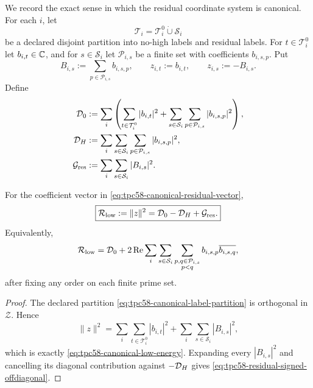 We record the exact sense in which the residual coordinate system is
canonical.  For each \(i\), let
\begin{equation}
 \mathcal T_i=\mathcal T_i^0\mathbin{\dot\cup}\mathcal S_i
 \label{eq:tpc58-canonical-label-partition}
\end{equation}
be a declared disjoint partition into no-high labels and residual labels.
For \(t\in\mathcal T_i^0\) let \(b_{i,t}\in\mathbb C\), and for
\(s\in\mathcal S_i\) let \(\mathcal P_{i,s}\) be a finite set with
coefficients \(b_{i,s,p}\).  Put
\begin{equation}
 B_{i,s}:=\sum_{p\in\mathcal P_{i,s}}b_{i,s,p},
 \qquad
 z_{i,t}:=b_{i,t},
 \qquad
 z_{i,s}:=-B_{i,s}.
 \label{eq:tpc58-canonical-residual-vector}
\end{equation}
Define
\begin{align}
 \mathcal D_0
 &:=\sum_i\left(
      \sum_{t\in\mathcal T_i^0}|b_{i,t}|^2
      +\sum_{s\in\mathcal S_i}\sum_{p\in\mathcal P_{i,s}}
       |b_{i,s,p}|^2\right),
 \label{eq:tpc58-ambient-diagonal}\\
 \mathcal D_H
 &:=\sum_i\sum_{s\in\mathcal S_i}
      \sum_{p\in\mathcal P_{i,s}}|b_{i,s,p}|^2,
 \label{eq:tpc58-high-diagonal}\\
 \mathcal G_{\rm res}
 &:=\sum_i\sum_{s\in\mathcal S_i}|B_{i,s}|^2.
 \label{eq:tpc58-abstract-residual-grouped-energy}
\end{align}

\begin{proposition}
\label{prop:tpc58-canonical-residual-identity}
For the coefficient vector in
\eqref{eq:tpc58-canonical-residual-vector},
\begin{equation}
 \boxed{
 \mathcal R_{\rm low}:=\|z\|^2
 =\mathcal D_0-\mathcal D_H+\mathcal G_{\rm res}.}
 \label{eq:tpc58-canonical-low-energy}
\end{equation}
Equivalently,
\begin{equation}
 \mathcal R_{\rm low}
 =\mathcal D_0+2\operatorname{Re}
   \sum_i\sum_{s\in\mathcal S_i}
   \sum_{\substack{p,q\in\mathcal P_{i,s}\\p<q}}
   b_{i,s,p}\overline{b_{i,s,q}},
 \label{eq:tpc58-residual-signed-offdiagonal}
\end{equation}
after fixing any order on each finite prime set.
\end{proposition}

\begin{proof}
The declared partition
\eqref{eq:tpc58-canonical-label-partition} is orthogonal in
\(\mathcal Z\).  Hence
\[
 \|z\|^2
 =\sum_i\sum_{t\in\mathcal T_i^0}|b_{i,t}|^2
  +\sum_i\sum_{s\in\mathcal S_i}|B_{i,s}|^2,
\]
which is exactly
\eqref{eq:tpc58-canonical-low-energy}.  Expanding every \(|B_{i,s}|^2\)
and cancelling its diagonal contribution against \(-\mathcal D_H\) gives
\eqref{eq:tpc58-residual-signed-offdiagonal}.
\end{proof}

